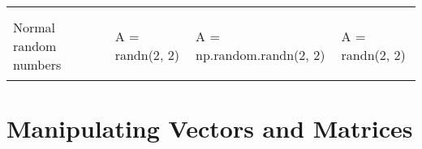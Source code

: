 \documentclass[10pt, landscape]{article}
\newenvironment{Shaded}{}{}
\newcommand{\DecValTok}[1]{\textcolor[rgb]{0.25,0.63,0.44}{{#1}}}
\newcommand{\FloatTok}[1]{\textcolor[rgb]{0.25,0.63,0.44}{{#1}}}
\newcommand{\OperatorTok}[1]{\textcolor[rgb]{0.40,0.40,0.40}{{#1}}}
\newcommand{\NormalTok}[1]{{#1}}
\begin{document}
\begin{multicols*}{2}
\begin{table}[ht]
\begin{tabular}[ ]{@{}llll@{}}
\begin{minipage}[t]{0.20\columnwidth}
\begin{Shaded}
\end{Shaded}
\strut
\end{minipage}\tabularnewline
\begin{minipage}[t]{0.24\columnwidth}\raggedright\strut
Normal random numbers\strut
\end{minipage} & \begin{minipage}[t]{0.20\columnwidth}\raggedright\strut
\begin{Shaded}
\begin{Highlighting}[]
\NormalTok{A = randn(}\FloatTok{2}\NormalTok{, }\FloatTok{2}\NormalTok{)}
\end{Highlighting}
\end{Shaded}
\strut
\end{minipage} & \begin{minipage}[t]{0.25\columnwidth}\raggedright\strut
\begin{Shaded}
\begin{Highlighting}[]
\NormalTok{A }\OperatorTok{=} \NormalTok{np.random.randn(}\DecValTok{2}\NormalTok{, }\DecValTok{2}\NormalTok{)}
\end{Highlighting}
\end{Shaded}
\strut
\end{minipage} & \begin{minipage}[t]{0.20\columnwidth}\raggedright\strut
\begin{Shaded}
\begin{Highlighting}[]
\NormalTok{A = randn(}\FloatTok{2}\NormalTok{, }\FloatTok{2}\NormalTok{)}
\end{Highlighting}
\end{Shaded}
\strut
\end{minipage}\tabularnewline
\bottomrule
\end{tabular}
\end{table}

\section{Manipulating Vectors and
Matrices}\label{manipulating-vectors-and-matrices}


\end{multicols*}
\end{document}
